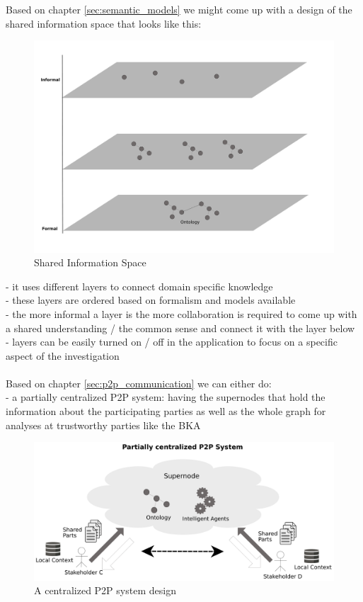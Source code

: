 Based on chapter \ref{sec:semantic_models} we might come up with a design of the shared information space that looks like this: \\

\begin{figure}[H]
	\centering
		\includegraphics[width=0.8\columnwidth]{images/sharedspace_layers.pdf}
	\caption{Shared Information Space}
\label{fig:images_sharedspace_layers}
\end{figure}

- it uses different layers to connect domain specific knowledge \\
- these layers are ordered based on formalism and models available \\
- the more informal a layer is the more collaboration is required to come up with a shared understanding / the common sense
and connect it with the layer below \\
- layers can be easily turned on / off in the application to focus on a specific aspect of the investigation \\
\\

Based on chapter \ref{sec:p2p_communication} we can either do: \\
- a partially centralized P2P system: having the supernodes that hold the information about the participating parties as well as the
whole graph for analyses at trustworthy parties like the BKA \\

\begin{figure}[H]
	\centering
		\includegraphics[width=0.8\columnwidth]{images/system_P2P_centralized.pdf}
	\caption{A centralized P2P system design}
\label{fig:images_system_P2P_centralized}
\end{figure}

